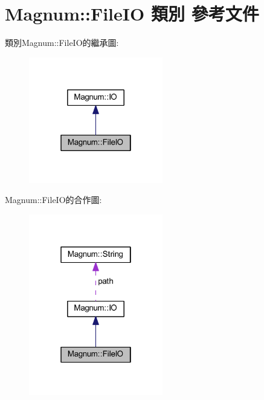 \hypertarget{class_magnum_1_1_file_i_o}{}\section{Magnum\+:\+:File\+IO 類別 參考文件}
\label{class_magnum_1_1_file_i_o}


類別\+Magnum\+:\+:File\+I\+O的繼承圖\+:\nopagebreak
\begin{figure}[H]
\begin{center}
\leavevmode
\includegraphics[width=166pt]{class_magnum_1_1_file_i_o__inherit__graph}
\end{center}
\end{figure}


Magnum\+:\+:File\+I\+O的合作圖\+:\nopagebreak
\begin{figure}[H]
\begin{center}
\leavevmode
\includegraphics[width=166pt]{class_magnum_1_1_file_i_o__coll__graph}
\end{center}
\end{figure}
